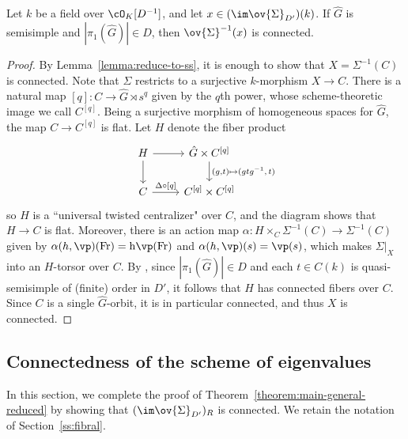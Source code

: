 \begin{lemma}\label{lemma:connected-fibers}
    Let $k$ be a field over $\cO_K[D^{-1}]$, and let $x \in (\im \ov{\Sigma}_{D'})(k)$. If $\hat{G}$ is semisimple and $|\pi_1(\hat{G})| \in D$, then $\ov{\Sigma}^{-1}(x)$ is connected.
\end{lemma}

\begin{proof}
    By Lemma~\ref{lemma:reduce-to-ss}, it is enough to show that $X = \Sigma^{-1}(C)$ is connected. Note that $\Sigma$ restricts to a surjective $k$-morphism $X \to C$. There is a natural map $[q]\colon C \to \hat{G} \rtimes s^q$ given by the $q$th power, whose scheme-theoretic image we call $C^{[q]}$. Being a surjective morphism of homogeneous spaces for $\hat{G}$, the map $C \to C^{[q]}$ is flat. Let $H$ denote the fiber product
    \[
    \begin{tikzcd}
        H \arrow[r] \arrow[d]
            &\hat{G} \times C^{[q]} \arrow[d, "{(g, t) \mapsto (g t g^{-1},\, t)}"] \\
        C \arrow[r, "\Delta \circ {[q]}"]
            &C^{{[q]}} \times C^{{[q]}}
    \end{tikzcd}
    \]
    so $H$ is a ``universal twisted centralizer" over $C$, and the diagram shows that $H \to C$ is flat. Moreover, there is an action map $\alpha\colon H \times_C \Sigma^{-1}(C) \to \Sigma^{-1}(C)$ given by $\alpha(h, \vp)(\rm{Fr}) = h\vp(\rm{Fr})$ and $\alpha(h, \vp)(s) = \vp(s)$, which makes $\Sigma|_X$ into an $H$-torsor over $C$. By \cite[9.11]{Steinberg-End}, since $|\pi_1(\hat{G})| \in D$ and each $t \in C(k)$ is quasi-semisimple of (finite) order in $D'$, it follows that $H$ has connected fibers over $C$. Since $C$ is a single $\hat{G}$-orbit, it is in particular connected, and thus $X$ is connected.
\end{proof}





\subsection{Connectedness of the scheme of eigenvalues}\label{ss:eigenvalues}

In this section, we complete the proof of Theorem~\ref{theorem:main-general-reduced} by showing that $(\im \ov{\Sigma}_{D'})_R$ is connected. We retain the notation of Section~\ref{ss:fibral}.\smallskip

